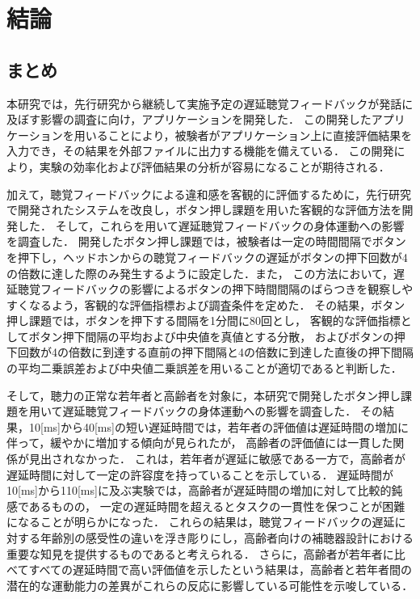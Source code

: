 \chapter{結論}
\section{まとめ}
本研究では，先行研究から継続して実施予定の遅延聴覚フィードバックが発話に及ぼす影響の調査に向け，アプリケーションを開発した．
この開発したアプリケーションを用いることにより，被験者がアプリケーション上に直接評価結果を入力でき，その結果を外部ファイルに出力する機能を備えている．
この開発により，実験の効率化および評価結果の分析が容易になることが期待される．

加えて，聴覚フィードバックによる違和感を客観的に評価するために，先行研究\cite{shigematu}で開発されたシステムを改良し，ボタン押し課題を用いた客観的な評価方法を開発した．
そして，これらを用いて遅延聴覚フィードバックの身体運動への影響を調査した．
開発したボタン押し課題では，被験者は一定の時間間隔でボタンを押下し，ヘッドホンからの聴覚フィードバックの遅延がボタンの押下回数が4の倍数に達した際のみ発生するように設定した．また，
この方法において，遅延聴覚フィードバックの影響によるボタンの押下時間間隔のばらつきを観察しやすくなるよう，客観的な評価指標および調査条件を定めた．
その結果，ボタン押し課題では，ボタンを押下する間隔を1分間に80回とし，
客観的な評価指標としてボタン押下間隔の平均および中央値を真値とする分散，
およびボタンの押下回数が4の倍数に到達する直前の押下間隔と4の倍数に到達した直後の押下間隔の平均二乗誤差および中央値二乗誤差を用いることが適切であると判断した．

そして，聴力の正常な若年者と高齢者を対象に，本研究で開発したボタン押し課題を用いて遅延聴覚フィードバックの身体運動への影響を調査した．
その結果，10[ms]から40[ms]の短い遅延時間では，若年者の評価値は遅延時間の増加に伴って，緩やかに増加する傾向が見られたが，
高齢者の評価値には一貫した関係が見出されなかった．
これは，若年者が遅延に敏感である一方で，高齢者が遅延時間に対して一定の許容度を持っていることを示している．
遅延時間が10[ms]から110[ms]に及ぶ実験では，高齢者が遅延時間の増加に対して比較的鈍感であるものの，
一定の遅延時間を超えるとタスクの一貫性を保つことが困難になることが明らかになった．
これらの結果は，聴覚フィードバックの遅延に対する年齢別の感受性の違いを浮き彫りにし，高齢者向けの補聴器設計における重要な知見を提供するものであると考えられる．
さらに，高齢者が若年者に比べてすべての遅延時間で高い評価値を示したという結果は，高齢者と若年者間の潜在的な運動能力の差異がこれらの反応に影響している可能性を示唆している．
